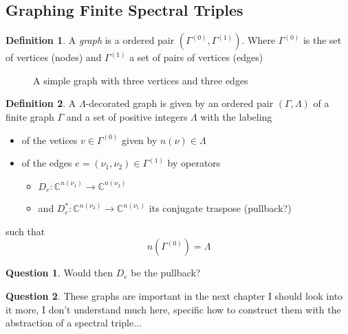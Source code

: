 \documentclass[a4paper]{article}
\theoremstyle{definition}
\newtheorem{definition}{Definition}
\theoremstyle{definition}
\newtheorem{question}{Question}
\theoremstyle{definition}
\theoremstyle{theorem}
\theoremstyle{theorem}
\theoremstyle{theorem}
\theoremstyle{definition}
\begin{document}
\subsection{Graphing Finite Spectral Triples}
\begin{definition}
    A \textit{graph} is a ordered pair $(\Gamma ^{(0)}, \Gamma ^{(1)})$.
    Where $\Gamma ^{(0)}$ is the set of vertices (nodes) and $\Gamma ^{(1)}$
    a set of pairs of vertices (edges)
\end{definition}
\begin{figure}[h!]
    \centering
{}
    \caption{A simple graph with three vertices and three edges}
\end{figure}
\begin{definition}
    A $\Lambda$-decorated graph is given by an ordered pair $(\Gamma,
    \Lambda)$ of a finite graph $\Gamma$ and a set of positive integers
    $\Lambda$ with the labeling
    \begin{itemize}
        \item of the vetices $v\in \Gamma ^{(0)}$ given by $n(\nu) \in
            \Lambda$
        \item of the edges $e = (\nu _1, \nu _2) \in \Gamma ^{(1)}$ by
            operators
            \begin{itemize}
                \item $D_e: \mathbb{C}^{n(\nu _1)} \rightarrow
                    \mathbb{C}^{n(\nu _2)}$
                \item and $D_e^*: \mathbb{C}^{n(\nu _2)} \rightarrow
                    \mathbb{C}^{n(\nu _1)}$ its conjugate traspose
                    (pullback?)
            \end{itemize}
    \end{itemize}
    such that
    \begin{equation}
        n(\Gamma ^{(0)}) = \Lambda
    \end{equation}
\end{definition}
\begin{question}
    Would then $D_e$ be the pullback?
\end{question}
\begin{question}
    These graphs are important in the next chapter I should look
    into it more, I don't understand much here, specific
    how to construct them with the abstraction of a spectral triple...
\end{question}
\end{document}
